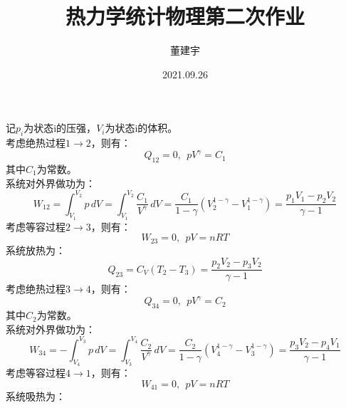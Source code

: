 \documentclass[a4paper,12pt]{article}
\title{热力学统计物理第二次作业}
\date{2021.09.26}
\author{董建宇}
\begin{document}
\maketitle

\titleformat{\section}[hang]{\small}{\thesection}{0.8em}{}{}
\titleformat{\subsection}[hang]{\small}{\thesubsection}{0.8em}{}{}

\section{}
记$p_i$为状态i的压强，$V_i$为状态i的体积。\\
考虑绝热过程$1\to 2$，则有：
\begin{equation}\nonumber
	Q_{12}=0,~~pV^\gamma =C_1
\end{equation}
其中$C_1$为常数。\\
系统对外界做功为：
\begin{equation}\nonumber
	W_{12}=\int_{V_1}^{V_2}p\,dV=\int_{V_1}^{V_2}\frac{C_1}{V^{\gamma}}\,dV = \frac{C_1}{1-\gamma} \left (V_2^{1-{\gamma}}-V_1^{1-{\gamma}} \right)=\frac{p_1V_1-p_2V_2}{\gamma-1}
\end{equation}
考虑等容过程$2\to 3$，则有：
\begin{equation}\nonumber
	W_{23}=0,~~pV=nRT
\end{equation}
系统放热为：
\begin{equation}\nonumber
	Q_{23}=C_V(T_2-T_3)=\frac{p_2V_2-p_3V_2}{\gamma-1}
\end{equation}
考虑绝热过程$3\to 4$，则有：
\begin{equation}\nonumber
	Q_{34}=0,~~pV^\gamma =C_2
\end{equation}
其中$C_2$为常数。\\
系统对外界做功为：
\begin{equation}\nonumber
	W_{34}=-\int_{V_4}^{V_3}p\,dV=\int_{V_3}^{V_4}\frac{C_2}{V^{\gamma}}\,dV = \frac{C_2}{1-\gamma} \left (V_4^{1-{\gamma}}-V_3^{1-{\gamma}} \right)=\frac{p_3V_2-p_4V_1}{\gamma-1}
\end{equation}
考虑等容过程$4\to 1$，则有：
\begin{equation}\nonumber
	W_{41}=0,~~pV=nRT
\end{equation}
系统吸热为：
\end{document}
